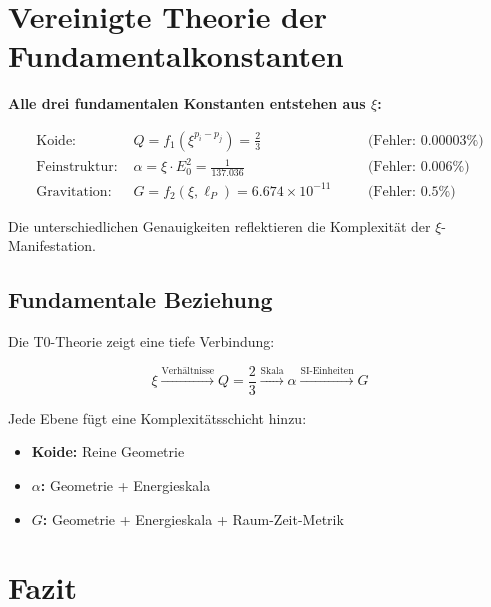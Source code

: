 	\section{Vereinigte Theorie der Fundamentalkonstanten}
	
	\begin{folgerung}
		\textbf{Alle drei fundamentalen Konstanten entstehen aus $\xi$:}
		
		\begin{align}
			\text{Koide: } & Q = f_1(\xi^{p_i - p_j}) = \frac{2}{3} \quad &&\text{(Fehler: } 0.00003\%) \\
			\text{Feinstruktur: } & \alpha = \xi \cdot E_0^2 = \frac{1}{137.036} \quad &&\text{(Fehler: } 0.006\%) \\
			\text{Gravitation: } & G = f_2(\xi, \ell_P) = 6.674 \times 10^{-11} \quad &&\text{(Fehler: } 0.5\%)
		\end{align}
		
		Die unterschiedlichen Genauigkeiten reflektieren die Komplexität der $\xi$-Manifestation.
	\end{folgerung}
	
	\subsection{Fundamentale Beziehung}
	
	Die T0-Theorie zeigt eine tiefe Verbindung:
	
	\begin{equation}
		\boxed{\xi \xrightarrow{\text{Verhältnisse}} Q = \frac{2}{3} \xrightarrow{\text{Skala}} \alpha \xrightarrow{\text{SI-Einheiten}} G}
	\end{equation}
	
	Jede Ebene fügt eine Komplexitätsschicht hinzu:
	\begin{itemize}
		\item \textbf{Koide:} Reine Geometrie
		\item \textbf{$\alpha$:} Geometrie + Energieskala
		\item \textbf{$G$:} Geometrie + Energieskala + Raum-Zeit-Metrik
	\end{itemize}
	
	\section{Fazit}
	
